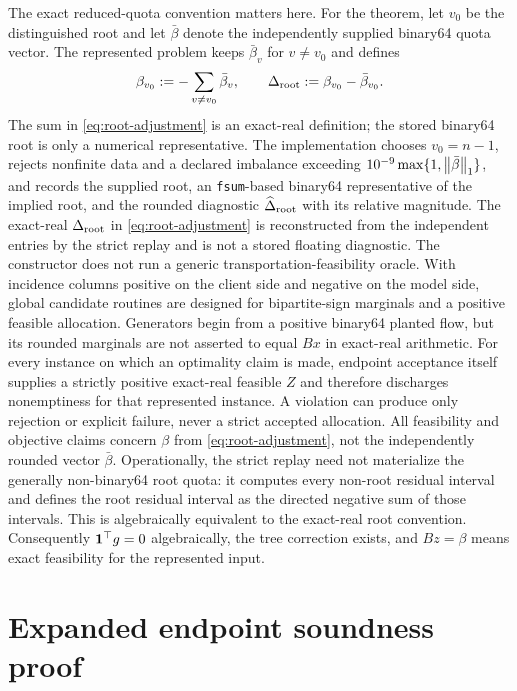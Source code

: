 The exact reduced-quota convention matters here.  For the theorem, let $v_0$ be
the distinguished root and let $\bar\beta$ denote the independently supplied
binary64 quota vector.  The represented problem keeps $\bar\beta_v$ for
$v\ne v_0$ and defines
\begin{equation}
 \beta_{v_0}:=-\sum_{v\ne v_0}\bar\beta_v,
 \qquad
 \Delta_{\rm root}:=\beta_{v_0}-\bar\beta_{v_0}.
 \label{eq:root-adjustment}
\end{equation}
The sum in \cref{eq:root-adjustment} is an exact-real definition; the stored
binary64 root is only a numerical representative.  The implementation chooses
$v_0=n-1$, rejects nonfinite data and a declared imbalance exceeding
$10^{-9}\max\{1,\left\lVert\bar\beta\right\rVert_1\}$, and records the supplied root, an
\texttt{fsum}-based binary64 representative of the implied root, and the
rounded diagnostic $\widehat\Delta_{\rm root}$ with its relative magnitude.
The exact-real $\Delta_{\rm root}$ in \cref{eq:root-adjustment} is reconstructed
from the independent entries by the strict replay and is not a stored floating
diagnostic.  The constructor does not run a generic
transportation-feasibility oracle.  With incidence columns positive on the
client side and negative on the model side, global candidate routines are
designed for bipartite-sign marginals and a positive feasible allocation.
Generators begin from a positive binary64 planted flow, but its rounded
marginals are not asserted to equal $Bx$ in exact-real arithmetic.  For every
instance on which an optimality claim is made, endpoint acceptance itself
supplies a strictly positive exact-real feasible $Z$ and therefore discharges
nonemptiness for that represented instance.  A violation can produce only
rejection or explicit failure, never a strict accepted allocation.  All
feasibility and objective claims concern $\beta$
from \cref{eq:root-adjustment}, not the independently rounded vector
$\bar\beta$.
Operationally, the strict replay need not materialize the generally
non-binary64 root quota: it computes every non-root residual interval and
defines the root residual interval as the directed negative sum of those
intervals.  This is algebraically equivalent to the exact-real root convention.
Consequently $\mathbf{1}^\top g=0$ algebraically, the tree correction exists, and
$Bz=\beta$ means exact feasibility for the represented input.

\section{Expanded endpoint soundness proof}
\label{app:soundness}

